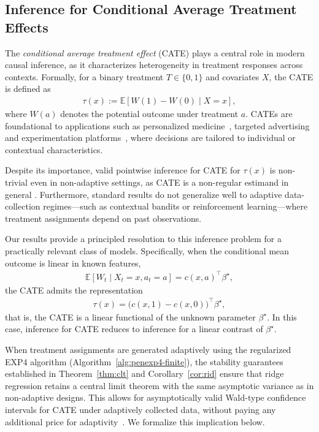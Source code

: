 \documentclass[11pt,letterpaper]{article}
\newcommand{\Exs}{\mathbb{E}}
\theoremstyle{plain}
\theoremstyle{definition}  %
\begin{document}
\subsection{Inference for Conditional Average Treatment Effects}
\label{sec:cate}

The \emph{conditional average treatment effect} (CATE) plays a central role in modern
causal inference, as it characterizes heterogeneity in treatment responses across
contexts. Formally, for a binary treatment $T \in \{0,1\}$ and covariates $X$, the CATE is
defined as
\begin{align*}
\tau(x) := \Exs\!\left[ W(1) - W(0) \mid X = x \right],
\end{align*}
where $W(a)$ denotes the potential outcome under treatment $a$.
CATEs are foundational to applications such as personalized medicine~\citep{powers2018some}, targeted
advertising~\citep{ascarza2018retention} and experimentation platforms~\citep{green2012modeling}, where decisions
are tailored to individual or contextual characteristics.

Despite its importance, valid pointwise inference for CATE for $\tau(x)$ is non-trivial even in non-adaptive settings, as CATE is a non-regular estimand in
general \citep{athey2016recursive,wager2018estimation,chernozhukov2018double,kunzel2019metalearners,nie2021quasi}. Furthermore, standard results do not generalize well to adaptive data-collection regimes—such as
contextual bandits or reinforcement learning—where treatment assignments depend on
past observations.

Our results provide a principled resolution to this inference problem for a
practically relevant class of models. Specifically, when the conditional mean outcome
is linear in known features,
\begin{align*}
\Exs[W_t \mid X_t = x, a_t = a] = c(x,a)^\top \beta^\star,
\end{align*}
the CATE admits the representation
\begin{align*}
\tau(x) = \big(c(x,1) - c(x,0)\big)^\top \beta^\star,
\end{align*}
that is, the CATE is a linear functional of the unknown parameter $\beta^\star$.
In this case, inference for CATE reduces to inference for a linear contrast of
$\beta^\star$.

When treatment assignments are generated adaptively using the regularized EXP4
algorithm (Algorithm~\ref{alg:penexp4-finite}), the stability guarantees established in
Theorem~\ref{thm:clt} and Corollary~\ref{cor:rid} ensure that ridge regression retains
a central limit theorem with the same asymptotic variance as in non-adaptive designs.
This allows for asymptotically valid Wald-type confidence intervals for CATE under adaptively collected data, without paying any additional price for adaptivity~\cite{abbasi2011improved}.
We formalize this implication below.
\end{document}
